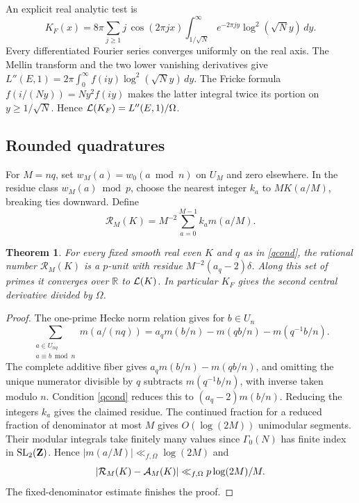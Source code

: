\documentclass[11pt]{article}
\newtheorem{theorem}{Theorem}[section]
\begin{document}
An explicit real analytic test is
\[
 K_F(x)=8\pi\sum_{j\ge1}j\,\cos(2\pi jx)
       \int_{1/\sqrt N}^{\infty}e^{-2\pi jy}\log^2(\sqrt N y)\,dy .
\]
Every differentiated Fourier series converges uniformly on the real axis. The Mellin transform and the two lower vanishing derivatives give $L''(E,1)=2\pi\int_0^\infty f(iy)\log^2(\sqrt N y)\,dy$. The Fricke formula $f(i/(Ny))=Ny^2 f(iy)$ makes the latter integral twice its portion on $y\ge1/\sqrt N$. Hence $\mathcal L(K_F)=L''(E,1)/\Omega$.

\subsection{Rounded quadratures}
For $M=nq$, set $w_M(a)=w_0(a\bmod n)$ on $U_M$ and zero elsewhere. In the residue class $w_M(a)\bmod p$, choose the nearest integer $k_a$ to $MK(a/M)$, breaking ties downward. Define
\[
 \mathcal R_M(K)=M^{-2}\sum_{a=0}^{M-1}k_a m(a/M).
\]
\begin{theorem}
For every fixed smooth real even $K$ and $q$ as in \eqref{qcond}, the rational number $\mathcal R_M(K)$ is a $p$-unit with residue $M^{-2}(a_q-2)\delta$. Along this set of primes it converges over $\mathbb R$ to $\mathcal L(K)$. In particular $K_F$ gives the second central derivative divided by $\Omega$.
\end{theorem}
\begin{proof}
The one-prime Hecke norm relation \cite[\S3]{KN} gives for $b\in U_n$
\[
 \sum_{\substack{a\in U_{nq}\\a\equiv b\bmod n}}m(a/(nq))
       =a_qm(b/n)-m(qb/n)-m(q^{-1}b/n).
\]
The complete additive fiber gives $a_qm(b/n)-m(qb/n)$, and omitting the unique numerator divisible by $q$ subtracts $m(q^{-1}b/n)$, with inverse taken modulo $n$. Condition \eqref{qcond} reduces this to $(a_q-2)m(b/n)$. Reducing the integers $k_a$ gives the claimed residue. The continued fraction for a reduced fraction of denominator at most $M$ gives $O(\log(2M))$ unimodular segments. Their modular integrals take finitely many values since $\Gamma_0(N)$ has finite index in $\mathrm{SL}_2(\mathbf Z)$. Hence $|m(a/M)|\ll_{f,\Omega}\log(2M)$ and
\[
 |\mathcal R_M(K)-\mathcal A_M(K)|\ll_{f,\Omega}p\log(2M)/M .
\]
The fixed-denominator estimate finishes the proof.
\end{proof}
\end{document}
